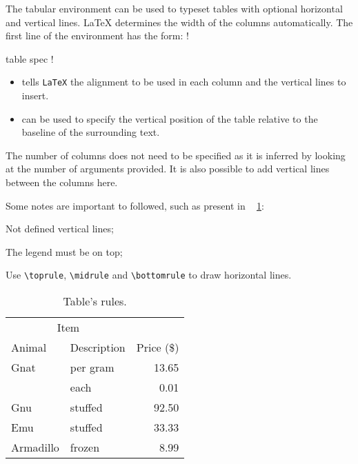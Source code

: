 The tabular environment can be used to typeset tables with optional horizontal and vertical lines. LaTeX determines the width of the columns automatically. The first line of the environment has the form:
\spverb!\begin{tabular}[pos]{table spec}
            !

            \begin{itemize}
                \item[table spec] tells \texttt{LaTeX} the alignment to be used in each column and the vertical lines to insert.
                \item[pos] can be used to specify the vertical position of the table relative to the baseline of the surrounding text.
            \end{itemize}

            The number of columns does not need to be specified as it is inferred by looking at the number of arguments provided. It is also possible to add vertical lines between the columns here.

            Some notes are important to followed, such as present in \tablename~ \ref{tab:results}:
            \begin{asparaenum}
                [i)]
                \item Not defined vertical lines;
                \item The legend must be on top;
                \item Use \verb!\toprule!, \verb!\midrule! and \verb!\bottomrule! to draw horizontal lines.
            \end{asparaenum}

            \begin{table}[ht]
                \caption{Table's rules.}
                \label{tab:results}
                \centering
                \begin{tabular}{llr}
                    \toprule
                    \multicolumn{2}{c}{Item} \\
                    \cmidrule(r){1-2}
                    Animal & Description & Price (\$)
                    \\
                    \midrule
                    Gnat      & per gram & 13.65 \\
                    & each     & 0.01  \\
                    Gnu       & stuffed  & 92.50 \\
                    Emu       & stuffed  & 33.33 \\
                    Armadillo & frozen   & 8.99  \\
                    \bottomrule
                \end{tabular}
            \end{table}


\end{tabular}
